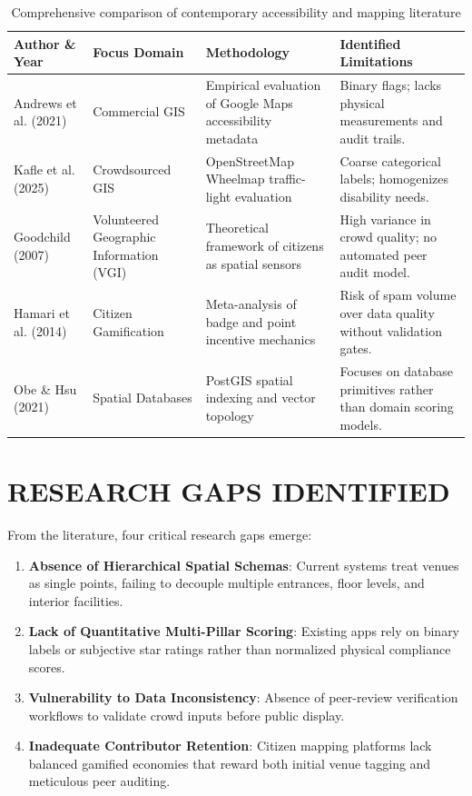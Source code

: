 \documentclass[12pt,a4paper]{report}
\begin{document}
\begin{table}[htbp]
\centering
\caption{Comprehensive comparison of contemporary accessibility and mapping literature}
\label{tab:literature_matrix}
\small
\begin{tabularx}{\textwidth}{p{3.2cm}p{3cm}p{3.5cm}X}
\toprule
\textbf{Author \& Year} & \textbf{Focus Domain} & \textbf{Methodology} & \textbf{Identified Limitations} \\
\midrule
Andrews et al. (2021)~\cite{andrews1989} & Commercial GIS & Empirical evaluation of Google Maps accessibility metadata & Binary flags; lacks physical measurements and audit trails. \\
\addlinespace
Kafle et al. (2025)~\cite{kafle2025} & Crowdsourced GIS & OpenStreetMap Wheelmap traffic-light evaluation & Coarse categorical labels; homogenizes disability needs. \\
\addlinespace
Goodchild (2007)~\cite{goodchild2007} & Volunteered Geographic Information (VGI) & Theoretical framework of citizens as spatial sensors & High variance in crowd quality; no automated peer audit model. \\
\addlinespace
Hamari et al. (2014)~\cite{hamari2014} & Citizen Gamification & Meta-analysis of badge and point incentive mechanics & Risk of spam volume over data quality without validation gates. \\
\addlinespace
Obe \& Hsu (2021)~\cite{postgis2024} & Spatial Databases & PostGIS spatial indexing and vector topology & Focuses on database primitives rather than domain scoring models. \\
\bottomrule
\end{tabularx}
\end{table}

\section{RESEARCH GAPS IDENTIFIED}
From the literature, four critical research gaps emerge:
\begin{enumerate}
    \item \textbf{Absence of Hierarchical Spatial Schemas}: Current systems treat venues as single points, failing to decouple multiple entrances, floor levels, and interior facilities.
    \item \textbf{Lack of Quantitative Multi-Pillar Scoring}: Existing apps rely on binary labels or subjective star ratings rather than normalized physical compliance scores.
    \item \textbf{Vulnerability to Data Inconsistency}: Absence of peer-review verification workflows to validate crowd inputs before public display.
    \item \textbf{Inadequate Contributor Retention}: Citizen mapping platforms lack balanced gamified economies that reward both initial venue tagging and meticulous peer auditing.
\end{enumerate}
\end{document}
